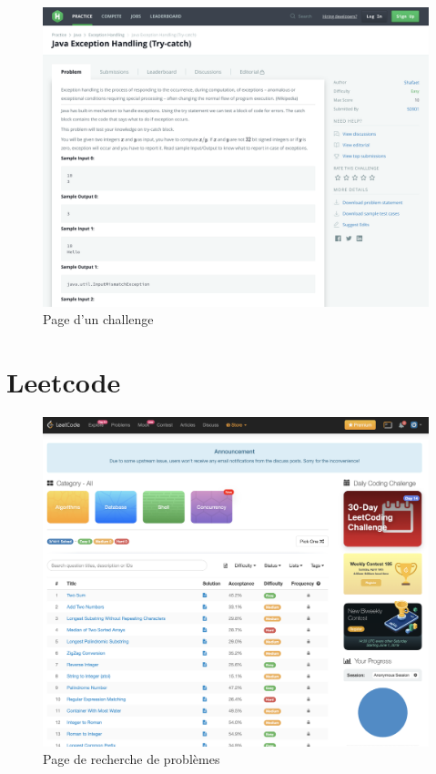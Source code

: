 \begin{figure}[H]
    \includegraphics[width=\textwidth,height=0.35\textheight,keepaspectratio]{images/comparison/hacker-3.png}
    \centering
    \caption[Hackerrank : page d'un challenge]{Page d'un challenge}
\end{figure}

\section{Leetcode}

\begin{figure}[H]
    \includegraphics[width=\textwidth,height=0.6\textheight,keepaspectratio]{images/comparison/leetcode-1.png}
    \centering
    \caption[Leetcode : page de recherche de problèmes]{Page de recherche de problèmes}
\end{figure}

